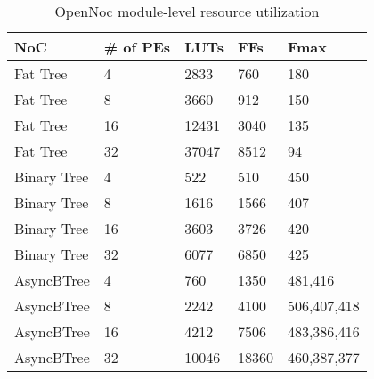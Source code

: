 \begin{table}[!b]
  \centering
  \vspace{-5mm}
  \caption{OpenNoc module-level resource utilization} 
  \begin{tabular}{l|l|l|l|l}
      \toprule
      NoC & \# of PEs & LUTs & FFs & Fmax \\
      \midrule
      \midrule
	  Fat Tree & 4      & 2833 & 760 & 180   \\
      Fat Tree & 8      & 3660 & 912 & 150   \\
      Fat Tree & 16     & 12431 & 3040 & 135 \\
      Fat Tree & 32     & 37047 & 8512 & 94  \\    
      \midrule
      Binary Tree  &  4         &  522 & 510 & 450\\
      Binary Tree  &  8         &  1616 & 1566 & 407\\
      Binary Tree  &  16        &  3603 & 3726 & 420\\
      Binary Tree  &  32        &  6077 & 6850 & 425\\
	  \midrule
      AsyncBTree & 4         & 760  & 1350 & 481,416\\
      AsyncBTree & 8         & 2242 & 4100 & 506,407,418\\
      AsyncBTree & 16        & 4212 & 7506 & 483,386,416 \\
      AsyncBTree & 32        & 10046 & 18360 & 460,387,377\\
      \bottomrule
    \end{tabular}
    \vspace{-5mm}
	\label{table:systemResourceConsumption}
\end{table}
